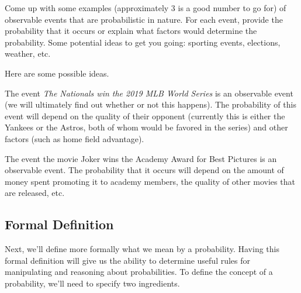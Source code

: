 \documentclass[assignment01_Solutions]{subfiles}
\begin{document}
\vspace{1em}
\begin{exercise}[(10 minutes)]
Come up with some examples (approximately 3 is a good number to go for) of observable events that are probabilistic in nature.  For each event, provide the probability that it occurs or explain what factors would determine the probability.  Some potential ideas to get you going: sporting events, elections, weather, etc.

\begin{boxedsolution}
Here are some possible ideas.
\bi
\item The event \emph{The Nationals win the 2019 MLB World Series} is an observable event (we will ultimately find out whether or not this happens).  The probability of this event will depend on the quality of their opponent (currently this is either the Yankees or the Astros, both of whom would be favored in the series) and other factors (such as home field advantage).
\item The event the movie Joker wins the Academy Award for Best Pictures is an observable event.  The probability that it occurs will depend on the amount of money spent promoting it to academy members, the quality of other movies that are released, etc.
\ei
\end{boxedsolution}

\end{exercise}

\subsection{Formal Definition}

Next, we'll define more formally what we mean by a probability.  Having this formal definition will give us the ability to determine useful rules for manipulating and reasoning about probabilities.  To define the concept of a probability, we'll need to specify two ingredients.
\end{document}
